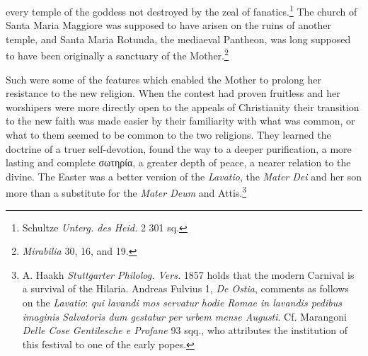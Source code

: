 \documentclass[a4paper, 11pt, oneside, polutonikogreek, english]{article}
\begin{document}
every temple of the goddess not destroyed by the zeal of fanatics.\footnote{Schultze \emph{Unterg. des Heid.} 2 301 sq.} The church of Santa Maria Maggiore was supposed to have arisen on the ruins of another temple, and Santa Maria Rotunda, the mediaeval Pantheon, was long supposed to have been originally a sanctuary of the Mother.\footnote{\emph{Mirabilia} 30, 16, and 19.}

Such were some of the features which enabled the Mother to prolong her resistance to the new religion. When the contest had proven fruitless and her worshipers were more directly open to the appeals of Christianity their transition to the new faith was made easier by their familiarity with what was common, or what to them seemed to be common to the two religions. They learned the doctrine of a truer self-devotion, found the way to a deeper purification, a more lasting and complete σωτηρία, a greater depth of peace, a nearer relation to the divine. The Easter was a better version of the \emph{Lavatio}, the \emph{Mater Dei} and her son more than a substitute for the \emph{Mater Deum} and Attis.\footnote{A. Haakh \emph{Stuttgarter Philolog. Vers.} 1857 holds that the modern Carnival is a survival of the Hilaria. Andreas Fulvius 1, \emph{De Ostia}, comments as follows on the \emph{Lavatio}: \emph{qui lavandi mos servatur hodie Romae in lavandis pedibus imaginis Salvatoris dum gestatur per urbem mense Augusti}. Cf. Marangoni \emph{Delle Cose Gentilesche e Profane} 93 sqq., who attributes the institution of this festival to one of the early popes.}
\clearpage
\end{document}
